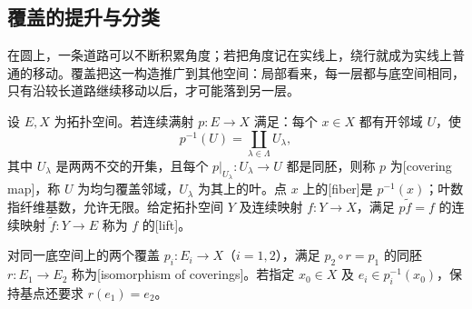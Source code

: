 \subsection{覆盖的提升与分类}
\label{g2:subsec:0101:03}
在圆上，一条道路可以不断积累角度；若把角度记在实线上，绕行就成为实线上普通的移动。覆盖把这一构造推广到其他空间：局部看来，每一层都与底空间相同，只有沿较长道路继续移动以后，才可能落到另一层。

\begin{definition}[覆盖与提升]\label{g2:def:covering-space}
	设 \(E,X\) 为拓扑空间。若连续满射 \(p:E\rightarrow X\) 满足：每个 \(x\in X\) 都有开邻域 \(U\)，使
	\[
		p^{-1}(U)=\coprod_{\lambda\in\Lambda}U_\lambda,
	\]
	其中 \(U_\lambda\) 是两两不交的开集，且每个 \(p|_{U_\lambda}:U_\lambda\rightarrow U\) 都是同胚，则称 \(p\) 为[covering map]，称 \(U\) 为均匀覆盖邻域，\(U_\lambda\) 为其上的叶。点 \(x\) 上的[fiber]是 \(p^{-1}(x)\)；叶数指纤维基数，允许无限。给定拓扑空间 \(Y\) 及连续映射 \(f:Y\rightarrow X\)，满足 \(p\widetilde f=f\) 的连续映射 \(\widetilde f:Y\rightarrow E\) 称为 \(f\) 的[lift]。

	对同一底空间上的两个覆盖 \(p_i:E_i\rightarrow X\)（\(i=1,2\)），满足 \(p_2\circ r=p_1\) 的同胚 \(r:E_1\rightarrow E_2\) 称为[isomorphism of coverings]。若指定 \(x_0\in X\) 及 \(e_i\in p_i^{-1}(x_0)\)，保持基点还要求 \(r(e_1)=e_2\)。
\end{definition}

